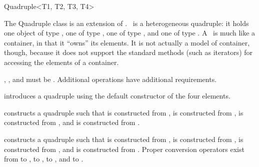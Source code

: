 \begin{ccRefClass}{Quadruple<T1, T2, T3, T4>}
  
  \ccDefinition The Quadruple class is an extension of
  .  \ccRefName\ is a heterogeneous quadruple: it holds
  one object of type , one of type , one of type
  , and one of type .  A \ccRefName\ is much like a
  container, in that it ``owns'' its elements. It is not actually a
  model of container, though, because it does not support the standard
  methods (such as iterators) for accessing the elements of a
  container.

  
  \ccRequirements {}, ,  and  must be
  . Additional operations have additional requirements.


  \ccTypes
  \ccGlue
  \ccGlue
  \ccGlue

  \ccGlue
  \ccGlue
  \ccGlue

  \ccCreation
  
   {introduces a quadruple using the
    default constructor of the four elements.}
  
   {constructs a
    quadruple such that  is constructed from ,
     is constructed from ,  is
    constructed from , and  is constructed from
    .}
  
   {constructs a quadruple such that
     is constructed from ,  is
    constructed from ,  is constructed from ,
    and  is constructed from . \ccRequire Proper
    conversion operators exist from  to ,  to
    ,  to , and  to .  }
   

\end{ccRefClass}

